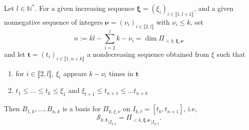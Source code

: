 \begin{thm}\label{thm:curry-sch}
  Let $l \in \mathbb{N}^*$. For a given increasing sequence $\bm{\xi} = {(\xi_i)}_{i \in \llbracket1,l+1\rrbracket}$, 
  and a given nonnegative sequence of integers $\bm{\nu} = {(\nu_i)}_{i \in \llbracket2,l\rrbracket}$ with $\nu_i \leq  
  k$, set \begin{equation*}
    n := kl - \sum_{i=2}^{l} k - \nu_i = \dim \Pi_{<k, \bm{\xi}, \bm{\nu}}
  \end{equation*}
  and let $\bm{t} = {(t_i)}_{i \in \llbracket1,n+k\rrbracket}$ a nondecreasing sequence obtained from $\xi$ such that
  \begin{enumerate}
    \item for $i \in \llbracket2,l\rrbracket$, $\xi_i$ appears $k-\nu_i$ times in $\bm{t}$
    \item $t_1 \leq \ldots \leq t_k \leq \xi_1$ and $\xi_{l+1} \leq t_{n+1} \leq \ldots t_{n+k}$
  \end{enumerate}
  Then $B_{1,k}, \ldots, B_{n,k}$ is a basis for $\Pi_{k, \xi, \nu}$ on $I_{k,t} = [t_k,t_{n+1}]$, i.e,
  \begin{equation*}
    {\mathscr{S}_{k, \bm{t}}}_{|I_{k,t}} = {\Pi_{<k, \bm{\xi}. \bm{\nu}}}_{|I_{k,t}}.
  \end{equation*}
\end{thm}
